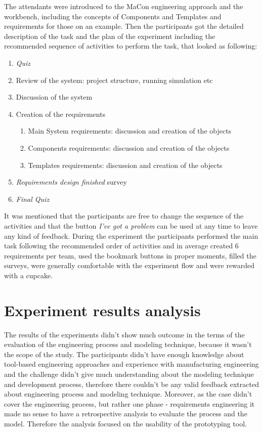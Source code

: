 The attendants were introduced to the MaCon engineering approach and the workbench, including the concepts of Components and Templates and requirements for those on an example. Then the participants got the detailed description of the task and the plan of the experiment including the recommended sequence of activities to perform the task, that looked as following:
\begin{enumerate}
\item \textit{Quiz}
\item Review of the system: project structure, running simulation etc
\item Discussion of the system 
\item Creation of the requirements
\begin{enumerate}
 \item Main System requirements: discussion and creation of the objects
 \item Components requirements: discussion and creation of the objects
 \item Templates requirements: discussion and creation of the objects
\end{enumerate}
\item \textit{Requirements design finished} survey
\item \textit{Final Quiz}
\end{enumerate}

It was mentioned that the participants are free to change the sequence of the activities and that the button \textit{I've got a problem} can be used at any time to leave any kind of feedback. During the experiment the participants performed the main task following the recommended order of activities and in average created 6 requirements per team, used the bookmark buttons in proper moments, filled the surveys, were generally comfortable with the experiment flow and were rewarded with a cupcake.\\


\section{Experiment results analysis}\label{section:experiment_result_analysis}

The results of the experiments didn't show much outcome in the terms of the evaluation of the engineering process and modeling technique, because it wasn't the scope of the study. The participants didn't have enough knowledge about tool-based engineering approaches and experience with manufacturing engineering and the challenge didn't give much understanding about the modeling technique and development process, therefore there couldn't be any valid feedback extracted about engineering process and modeling technique. Moreover, as the case didn't cover the engineering process, but rather one phase - requirements engineering it made no sense to have a retrospective analysis to evaluate the process and the model. Therefore the analysis focused on the usability of the prototyping tool. \\

